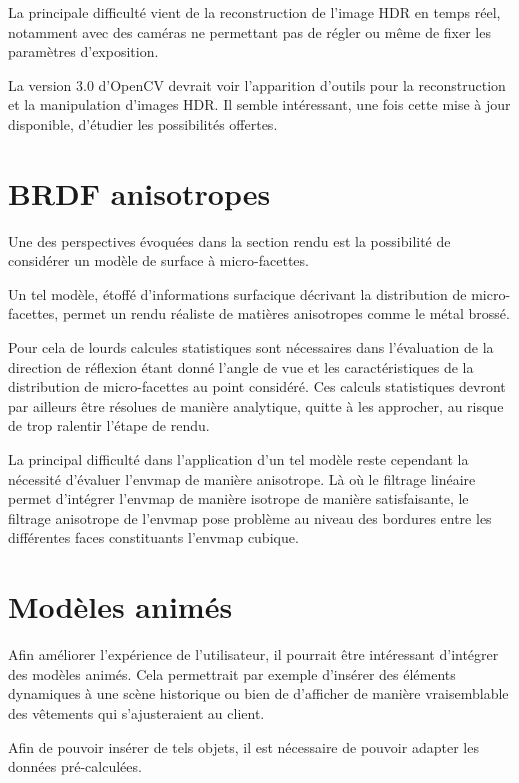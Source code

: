 \documentclass[10pt,a4paper,twoside, twocolumn]{report}
\begin{document}
La principale difficulté vient de la reconstruction de l’image HDR en temps réel, notamment avec des caméras ne permettant pas de régler ou même de fixer les paramètres d’exposition.

La version $3.0$ d’OpenCV devrait voir l’apparition d’outils pour la reconstruction et la manipulation d’images HDR. Il semble intéressant, une fois cette mise à jour disponible, d’étudier les possibilités offertes.


\section{BRDF anisotropes}

Une des perspectives évoquées dans la section rendu est la possibilité de considérer un modèle de surface à micro-facettes.

Un tel modèle, étoffé d’informations surfacique décrivant la distribution de micro-facettes, permet un rendu réaliste de matières anisotropes comme le métal brossé.

Pour cela de lourds calcules statistiques sont nécessaires dans l’évaluation de la direction de réflexion étant donné l’angle de vue et les caractéristiques de la distribution de micro-facettes au point considéré. Ces calculs statistiques devront par ailleurs être résolues de manière analytique, quitte à les approcher, au risque de trop ralentir l’étape de rendu.

La principal difficulté dans l’application d’un tel modèle reste cependant la nécessité d’évaluer l’envmap de manière anisotrope. Là où le filtrage linéaire permet d’intégrer l’envmap de manière isotrope de manière satisfaisante, le filtrage anisotrope de l’envmap pose problème au niveau des bordures entre les différentes faces constituants l’envmap cubique.


\section{Modèles animés}

Afin améliorer l’expérience de l’utilisateur, il pourrait être intéressant d’intégrer des modèles animés. Cela permettrait par exemple d’insérer des éléments dynamiques à une scène historique ou bien de d’afficher de manière vraisemblable des vêtements qui s’ajusteraient au client.

Afin de pouvoir insérer de tels objets, il est nécessaire de pouvoir adapter les données pré-calculées. 
\end{document}
